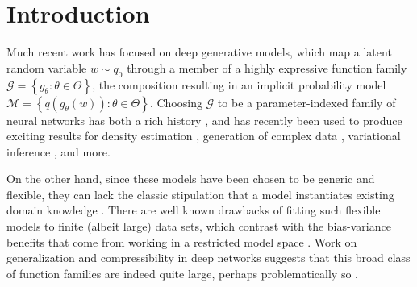 \documentclass{article}
\begin{document}
\section{Introduction}
Much recent work has focused on deep generative models, which map a latent random variable $w\sim q_0$ through a member of a highly expressive function family $\mathcal{G} = \left\{g_\theta : \theta \in \Theta\right\}$, the composition resulting in an implicit probability model $\mathcal{M} = \left\{ q(g_\theta (w)) : \theta \in \Theta \right\}$.  Choosing $\mathcal{G}$ to be a parameter-indexed family of neural networks has both a rich history \citep{dayan1995helmholtz,mackay1997density}, and has recently been used to produce exciting results for density estimation \citep{uria2013rnade, rippel2013high, papamakarios2017masked}, generation of complex data \citep{Goodfellow:2014aa}, variational inference \citep{Kingma:2013aa, rezende2014stochastic, titsias2014doubly}, and more.

On the other hand, since these models have been chosen to be generic and flexible, they can lack the classic stipulation that a model instantiates existing domain knowledge \citep{gelman2014bayesian, tenenbaum2006theory, mccullagh2002}.  There are well known drawbacks of fitting such flexible models to finite (albeit large) data sets, which contrast with the bias-variance benefits that come from working in a restricted model space \citep[\S 7.3]{friedman2001elements}.  Work on generalization and compressibility in deep networks suggests that this broad class of function families are indeed quite large, perhaps problematically so \citep{zhou2018compressibility}.  
\end{document}
